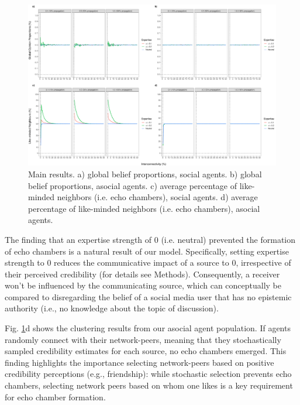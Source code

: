 \documentclass[fleqn,10pt]{wlscirep}
\providecommand{\DIFdelbegin}{} %
\providecommand{\DIFaddbeginFL}{} %
\providecommand{\DIFaddendFL}{} %
\providecommand{\DIFdelbeginFL}{} %
\providecommand{\DIFdelendFL}{} %
\begin{document}
\begin{figure}[ht]
\centering
\DIFdelbeginFL %
\DIFdelendFL \DIFaddbeginFL \includegraphics[width=1\columnwidth]{img/results_color.pdf}
\DIFaddendFL \caption{Main results. a) global belief proportions, social agents. b) global belief proportions, asocial agents. c) average percentage of like-minded neighbors (i.e. echo chambers), social agents. d) average percentage of like-minded neighbors (i.e. echo chambers), asocial agents.}
\label{fig:results}
\end{figure}

The finding that an expertise strength of 0 (i.e. neutral) prevented the formation of echo chambers is a natural result of our model. Specifically, setting expertise strength to 0 reduces the communicative impact of a source to 0, irrespective of their perceived credibility (for details see Methods). Consequently, a receiver won't be influenced by the communicating source, which can conceptually be compared to disregarding the belief of a social media user that has no epistemic authority (i.e., no knowledge about the topic of discussion).

Fig. \ref{fig:results}d shows the clustering results from our asocial agent population. If agents randomly connect with their network-peers, meaning that they stochastically sampled credibility estimates for each source, no echo chambers emerged. This finding highlights the importance selecting network-peers based on positive credibility perceptions (e.g., friendship): while stochastic selection prevents echo chambers, selecting network peers based on whom one likes is a key requirement for echo chamber formation. \DIFdelbegin %
\end{document}
